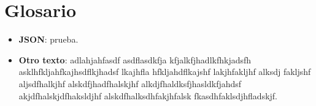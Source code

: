 \chapter {Glosario}
    \begin{itemize}
		\item \textbf{JSON}: prueba.
		\item \textbf{Otro texto}: adlahjahfasdf asdflasdkfja kfjalkfjhadlkfhkjadsfh asklhfkljahfkajhsdflkjhadsf lkajhfla hfkljahdflkajshf lakjhfakljhf alksdj fakljshf aljsdfhalkjhf alskdfjhadfhalskjhf alkdjfhaldksfjhasldkfjahdsf akjdfhalskjdfhaksldjhf alskdfhalksdhfakjhfalsk fkasdhfaklsdjhfladskjf.
	\end{itemize}